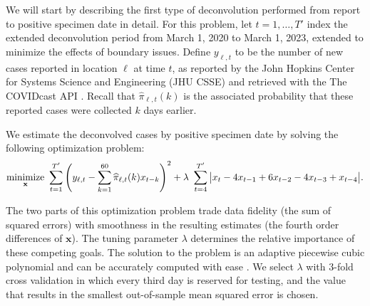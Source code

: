 We will start by describing the first type of deconvolution performed from
report to positive specimen date in detail. For this problem, let $t=1,\ldots,T'$
index the extended deconvolution period from March 1, 2020 to March 1, 2023,
extended to minimize the effects of boundary issues.  Define $y_{\ell,t}$
to be the number of new cases reported in location $\ell$ at time $t$, as
reported by the John Hopkins Center for Systems Science and Engineering (JHU
CSSE)\citealp{dong2020interactive} and retrieved with the The COVIDcast API
\citep{reinhart2021open}. Recall that $\widehat{\pi}_{\ell,t}(k)$ is the
associated probability that these reported cases were collected $k$ days earlier. 

We estimate the deconvolved cases by positive specimen date by solving the
following optimization problem:
\begin{align}
\operatorname*{minimize}_{\mathbf{x}}\ \sum_{t=1}^{T'} 
\left( y_{\ell,t} -  \sum_{k=1}^{60}\widehat{\pi}_{\ell,t}(k) x_{t-k} \right)^2 
+ \lambda\ \sum_{t=4}^{T'} \big|x_t - 4x_{t-1} + 6x_{t-2} -4x_{t-3}+ x_{t-4}\big|.
\end{align}

The two parts of this optimization problem trade data fidelity (the sum of
squared errors) with smoothness in the resulting estimates (the fourth order
differences of $\mathbf{x}$). The tuning parameter $\lambda$ determines
the relative importance of these competing goals. The solution to the problem is
an adaptive piecewise cubic polynomial \citep{tibshirani2014adaptive,
tibshirani2022divided} and can be accurately computed with ease
\citep{ramdas2016fast}. We select $\lambda$ with $3$-fold cross validation
\citep{jahja2022real} in which every third day is reserved for testing, and the
value that results in the smallest out-of-sample mean squared error is chosen.

